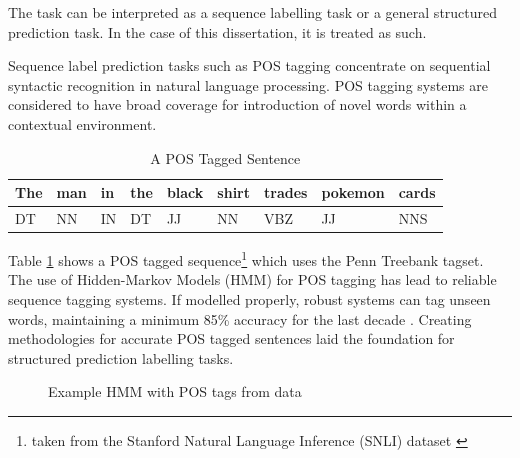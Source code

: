 The \dimsum task can be interpreted as a sequence labelling task or a general structured prediction task. In the case of this dissertation, it is treated as such.

Sequence label prediction tasks such as POS tagging concentrate on sequential syntactic recognition in natural language processing. POS tagging systems are considered to have broad coverage for introduction of novel words within a contextual environment.

\begin{table}[!htbp]
  \centering
  \begin{tabular}{ lllllllll }
    The & man & in & the & black & shirt & trades & pokemon & cards\\
    \hline
    DT & NN & IN & DT & JJ & NN & VBZ & JJ & NNS\\
  \end{tabular}
  \caption{A POS Tagged Sentence}
  \label{tab:postagseq}
\end{table}

Table \ref{tab:postagseq} shows a POS tagged sequence\footnote{taken from the Stanford Natural Language Inference (SNLI) dataset \cite{bowman2015large}} which uses the Penn Treebank tagset\cite{Marcus1993}. The use of Hidden-Markov Models (HMM) for POS tagging\cite{Collins2002} has lead to reliable sequence tagging systems. If modelled properly, robust systems can tag unseen words, maintaining a minimum 85\% accuracy for the last decade \cite{brants2000tnt}. Creating methodologies for accurate POS tagged sentences laid the foundation for structured prediction labelling tasks.

\begin{figure}[H]
  \tikzset{font=\footnotesize}
  \centering
  \caption{Example HMM with POS tags from \dimsum data}
  \label{fig:hmmposdimsum}
\end{figure}

